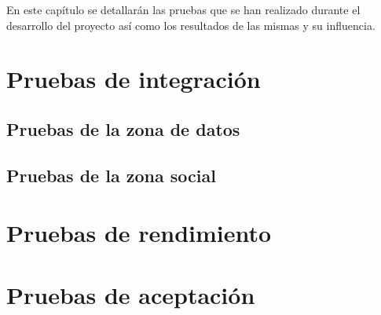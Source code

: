 En este capítulo se detallarán las pruebas que se han realizado durante el desarrollo del proyecto así como los resultados de las mismas y su influencia.


\section{Pruebas de integración}
\label{pruebas:integracion}
	
	
	\subsection{Pruebas de la zona de datos}
	\label{pruebas:integracion:zona_datos}
	
	
	
	\subsection{Pruebas de la zona social}
	\label{pruebas:integracion:zona_social}
	


\section{Pruebas de rendimiento}
\label{pruebas:rendimiento}



\section{Pruebas de aceptación}
\label{pruebas:aceptacion}
